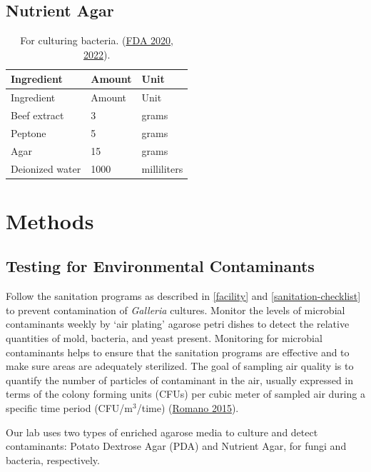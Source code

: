 \documentclass{sop_class}[overrideChapters] %
\begin{document}
{\hypertarget{nutrient-agar}{%
\subsection{Nutrient Agar}\label{nutrient-agar}}
\begin{longtable}[]{@{}lll@{}}
\caption{For culturing bacteria. (\protect\hyperlink{ref-FDA2020}{FDA 2020}, \protect\hyperlink{ref-FDA2022}{2022}).}\tabularnewline
\toprule()
Ingredient & Amount & Unit \\
\midrule()
\endfirsthead
\toprule()
Ingredient & Amount & Unit \\
\midrule()
\endhead
Beef extract & 3 & grams \\
Peptone & 5 & grams \\
Agar & 15 & grams \\
Deionized water & 1000 & milliliters \\
\bottomrule()
\end{longtable}
\hypertarget{methods-6}{%
\section{Methods}\label{methods-6}}

\hypertarget{environmental-microbiology}{%
\subsection{Testing for Environmental Contaminants}\label{environmental-microbiology}}

Follow the sanitation programs as described in \ref{facility} and
\ref{sanitation-checklist} to prevent contamination of \emph{Galleria}
cultures. Monitor the levels of microbial contaminants weekly by `air
plating' agarose petri dishes to detect the relative quantities of mold,
bacteria, and yeast present. Monitoring for microbial contaminants helps
to ensure that the sanitation programs are effective and to make sure
areas are adequately sterilized. The goal of sampling air quality is to
quantify the number of particles of contaminant in the air, usually
expressed in terms of the colony forming units (CFUs) per cubic meter of
sampled air during a specific time period (CFU/m\(^3\)/time)
(\protect\hyperlink{ref-Romano2015}{Romano 2015}).

Our lab uses two types of enriched agarose media to culture and detect
contaminants: Potato Dextrose Agar (PDA) and Nutrient Agar, for fungi
and bacteria, respectively.

\hypertarget{prep-media}{%
}}
\end{document}
